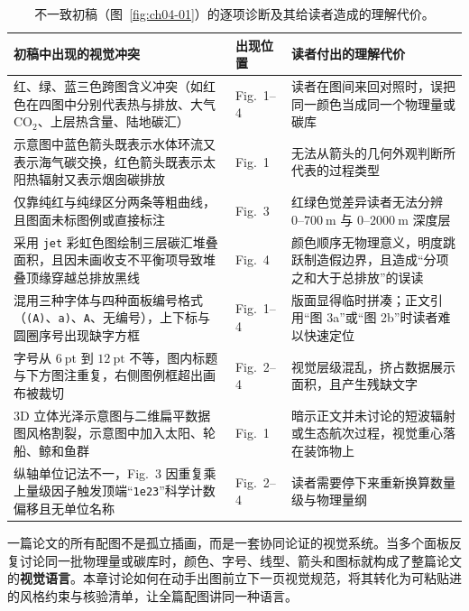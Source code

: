 \begin{table}[htbp]\centering\footnotesize
\setlength{\tabcolsep}{3pt}
\renewcommand{\arraystretch}{1.15}
\caption{不一致初稿（图~\ref{fig:ch04-01}）的逐项诊断及其给读者造成的理解代价。}\label{tab:ch04-diag}
\begin{tabularx}{\linewidth}{@{}Y>{\raggedright\arraybackslash}p{18mm}Y@{}}
\toprule
\textbf{初稿中出现的视觉冲突} & \textbf{出现位置} & \textbf{读者付出的理解代价} \\
\midrule
红、绿、蓝三色跨图含义冲突（如红色在四图中分别代表热与排放、大气 $\text{CO}_2$、上层热含量、陆地碳汇） & Fig.\ 1–4 & 读者在图间来回对照时，误把同一颜色当成同一个物理量或碳库 \\
示意图中蓝色箭头既表示水体环流又表示海气碳交换，红色箭头既表示太阳热辐射又表示烟囱碳排放 & Fig.\ 1 & 无法从箭头的几何外观判断所代表的过程类型 \\
仅靠纯红与纯绿区分两条等粗曲线，且图面未标图例或直接标注 & Fig.\ 3 & 红绿色觉差异读者无法分辨 $0\text{--}700\ \text{m}$ 与 $0\text{--}2000\ \text{m}$ 深度层 \\
采用 \texttt{jet} 彩虹色图绘制三层碳汇堆叠面积，且因未画收支不平衡项导致堆叠顶缘穿越总排放黑线 & Fig.\ 4 & 颜色顺序无物理意义，明度跳跃制造假边界，且造成“分项之和大于总排放”的误读 \\
混用三种字体与四种面板编号格式（\texttt{(A)}、\texttt{a)}、\texttt{A}、无编号），上下标与圆圈序号出现缺字方框 & Fig.\ 1–4 & 版面显得临时拼凑；正文引用“图 3a”或“图 2b”时读者难以快速定位 \\
字号从 $6\ \text{pt}$ 到 $12\ \text{pt}$ 不等，图内标题与下方图注重复，右侧图例框超出画布被裁切 & Fig.\ 2–4 & 视觉层级混乱，挤占数据展示面积，且产生残缺文字 \\
3D 立体光泽示意图与二维扁平数据图风格割裂，示意图中加入太阳、轮船、鲸和鱼群 & Fig.\ 1 & 暗示正文并未讨论的短波辐射或生态航次过程，视觉重心落在装饰物上 \\
纵轴单位记法不一，Fig.\ 3 因重复乘上量级因子触发顶端“\texttt{1e23}”科学计数偏移且无单位名称 & Fig.\ 2–4 & 读者需要停下来重新换算数量级与物理量纲 \\
\bottomrule
\end{tabularx}
\end{table}

一篇论文的所有配图不是孤立插画，而是一套协同论证的视觉系统。当多个面板反复讨论同一批物理量或碳库时，颜色、字号、线型、箭头和图标就构成了整篇论文的\textbf{视觉语言}。本章讨论如何在动手出图前立下一页视觉规范，将其转化为可粘贴进 \scidraw{} 的风格约束与核验清单，让全篇配图讲同一种语言。

